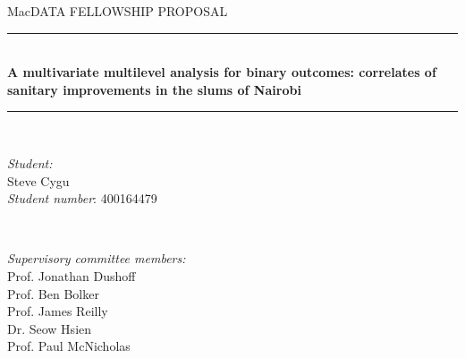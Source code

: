 \documentclass[12pt]{article}
\begin{document}
\begin{titlepage}

\newcommand{\HRule}{\rule{\linewidth}{0.5mm}} %

\center %


\Large MacDATA FELLOWSHIP PROPOSAL\\[0.5cm] %


\HRule \\[0.4cm]
{ \Huge \bfseries A multivariate multilevel analysis for binary outcomes: correlates of sanitary improvements in the slums of Nairobi}\\[0.4cm] %
\HRule \\[1.5cm]



\begin{minipage}{0.3\textwidth}
\begin{flushleft} \large
\emph{Student:}\\
Steve Cygu\\
\emph{Student number}: 400164479 %
\end{flushleft}
\end{minipage}
~
\begin{minipage}{0.6\textwidth}
\begin{flushright} \large
\emph{Supervisory committee members:} \\
Prof. Jonathan Dushoff\\ %
Prof. Ben Bolker\\
Prof. James Reilly\\
Dr. Seow Hsien\\
Prof. Paul McNicholas
\end{flushright}
\end{minipage}\\[2cm]


\end{titlepage}
\end{document}
